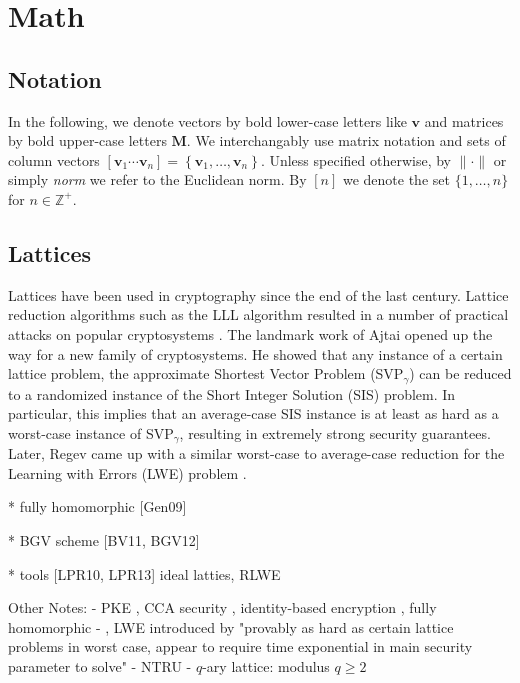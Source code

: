 \documentclass[
  a4paper,  %
  twoside,  %
  bibliography=totoc,
  headsepline,
  cleardoublepage=empty,
  parskip=half,
  draft=false
]{scrbook}
\begin{document}
\section{Math}



\subsection{Notation}
In the following, we denote vectors by bold lower-case letters like $\mathbf{v}$ and matrices by bold upper-case letters $\mathbf{M}$. We interchangably use matrix notation and sets of column vectors $\left[\mathbf{v}_1 \cdots \mathbf{v}_n\right] = \left\{\mathbf{v}_1, \dots, \mathbf{v}_n\right\}$. Unless specified otherwise, by $\| \cdot \|$ or simply \textit{norm} we refer to the Euclidean norm. By $[n]$ we denote the set $\{1, \dots, n\}$ for $n\in \mathbb{Z}^+$.


\subsection{Lattices}
Lattices have been used in cryptography since the end of the last century. Lattice reduction algorithms such as the LLL algorithm resulted in a number of practical attacks on popular cryptosystems \cite{NV10}. The landmark work of Ajtai \cite{Ajt96} opened up the way for a new family of cryptosystems. He showed that any instance of a certain lattice problem, the approximate Shortest Vector Problem (SVP$_\gamma$) can be reduced to a randomized instance of the Short Integer Solution (SIS) problem. In particular, this implies that an average-case SIS instance is at least as hard as a worst-case instance of SVP$_\gamma$, resulting in extremely strong security guarantees. Later, Regev came up with a similar worst-case to average-case reduction for the Learning with Errors (LWE) problem \cite{Reg05}.

* fully homomorphic [Gen09]

* BGV scheme [BV11, BGV12]

* tools [LPR10, LPR13] ideal latties, RLWE

Other Notes: %
- PKE \cite{AD97, Reg03, Reg05}, CCA security \cite{PW08, Pei09}, identity-based encryption \cite{GPV08, CHKP10, ABB10}, fully homomorphic \cite{Gen09a}
- , LWE introduced by \cite{Reg05} "provably as hard as certain lattice problems in worst case, appear to require time exponential in main security parameter to solve"
- NTRU \cite{HPS98}
- $q$-ary lattice: modulus $q\geq 2$
\end{document}
